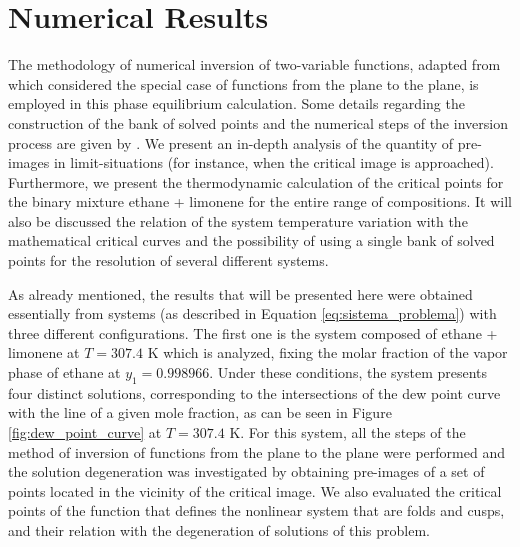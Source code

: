 \documentclass[journal=iecred,manuscript=article]{achemso}
\theoremstyle{definition}
\theoremstyle{remark}
\begin{document}
%

\section{Numerical Results}

The methodology of numerical inversion of two-variable functions, adapted from \citet{malta} which considered the special case of functions from the plane to the plane, is employed in this phase equilibrium calculation. Some details regarding the construction of the bank of solved points and the numerical steps of the inversion process are given by \citet{ireme}. We present an in-depth analysis of the quantity of pre-images in limit-situations (for instance, when  the critical image is approached). Furthermore, we present the thermodynamic calculation of the critical points for the binary mixture ethane + limonene for the entire range of compositions. It will also be discussed the relation of the system temperature variation with the mathematical critical curves and the possibility of using a single bank of solved points for the resolution of several different systems.

As already mentioned, the results that will be presented here were obtained essentially from systems (as described in Equation \ref{eq:sistema_problema}) with three different configurations. The first one is the system composed of ethane + limonene at $ T = 307.4 $ K which is analyzed, fixing the molar fraction of the vapor phase of ethane at $ y_{1} = 0.998966 $. Under these conditions, the system presents four distinct solutions, corresponding to the intersections of the dew point curve with the line of a given mole fraction, as can be seen in Figure \ref{fig:dew_point_curve} at $ T = 307.4 $ K. For this system, all the steps of the method of inversion of functions from the plane to the plane were performed and the solution degeneration was investigated by obtaining pre-images of a set of points located in the vicinity of the critical image. We also evaluated the critical points of the function that defines the nonlinear system that are folds and cusps, and their relation with the degeneration of solutions of this problem.
\end{document}
